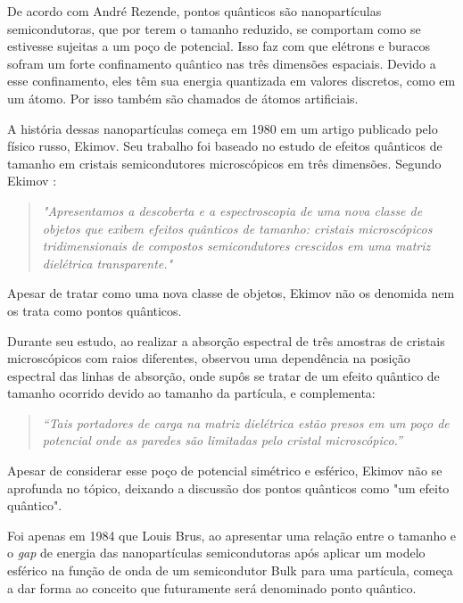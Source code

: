 \par De acordo com André Rezende\cite{introducao1}, pontos quânticos são nanopartículas semicondutoras, que por terem o tamanho reduzido, se comportam como se estivesse sujeitas a um poço de potencial. Isso faz com que elétrons e buracos sofram um forte confinamento quântico nas três dimensões espaciais. Devido a esse confinamento, eles têm sua energia quantizada em valores discretos, como em um átomo. Por isso também são chamados de átomos artificiais.

\par A história dessas nanopartículas começa em 1980 em um artigo publicado pelo físico russo, Ekimov. Seu trabalho foi baseado no estudo de efeitos quânticos de tamanho em cristais semicondutores microscópicos em três dimensões. Segundo Ekimov \cite{introducao2}:

\begin{quote}
\textit{"Apresentamos a descoberta e a espectroscopia de uma nova classe de objetos que exibem efeitos quânticos de tamanho: cristais microscópicos tridimensionais de compostos semicondutores crescidos em uma matriz dielétrica transparente."}
\end{quote}

\par Apesar de tratar como uma nova classe de objetos, Ekimov não os denomida nem os trata como pontos quânticos.

\par Durante seu estudo, ao realizar a absorção espectral de três amostras de cristais microscópicos com raios diferentes, observou uma dependência na posição espectral das linhas de absorção, onde supôs se tratar de um efeito quântico de tamanho ocorrido devido ao tamanho da partícula, e complementa:

\begin{quote}
\textit{“Tais portadores de carga na matriz dielétrica estão presos em um poço de potencial onde as paredes são limitadas pelo cristal microscópico.”}
\end{quote}

\par Apesar de considerar esse poço de potencial simétrico e esférico, Ekimov não se aprofunda no tópico, deixando a discussão dos pontos quânticos como "um efeito quântico".

\par Foi apenas em 1984 que Louis Brus, ao apresentar uma relação entre o tamanho e o \textit{gap} de energia das nanopartículas semicondutoras após aplicar um modelo esférico na função de onda de um semicondutor Bulk para uma partícula, começa a dar forma ao conceito que futuramente será denominado ponto quântico.

